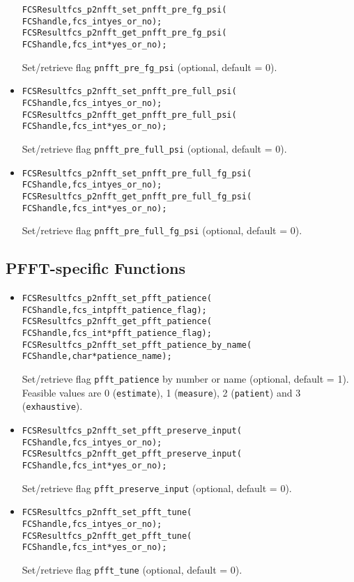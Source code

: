 \begin{itemize}
\begin{alltt}
FCSResult fcs_p2nfft_set_pnfft_pre_fg_psi(
    FCS handle, fcs_int yes_or_no);
FCSResult fcs_p2nfft_get_pnfft_pre_fg_psi(
    FCS handle, fcs_int* yes_or_no);
\end{alltt}
    Set/retrieve flag \verb!pnfft_pre_fg_psi! (optional, default = 0).
  \item
\begin{alltt}
FCSResult fcs_p2nfft_set_pnfft_pre_full_psi(
    FCS handle, fcs_int yes_or_no);
FCSResult fcs_p2nfft_get_pnfft_pre_full_psi(
    FCS handle, fcs_int* yes_or_no);
\end{alltt}
    Set/retrieve flag \verb!pnfft_pre_full_psi! (optional, default = 0).
  \item
\begin{alltt}
FCSResult fcs_p2nfft_set_pnfft_pre_full_fg_psi(
    FCS handle, fcs_int yes_or_no);
FCSResult fcs_p2nfft_get_pnfft_pre_full_fg_psi(
    FCS handle, fcs_int* yes_or_no);
\end{alltt}
    Set/retrieve flag \verb!pnfft_pre_full_fg_psi! (optional, default = 0).
\end{itemize}

\subsection{PFFT-specific Functions}
\begin{itemize}
  \item
\begin{alltt}
FCSResult fcs_p2nfft_set_pfft_patience(
    FCS handle, fcs_int pfft_patience_flag);
FCSResult fcs_p2nfft_get_pfft_patience(
    FCS handle, fcs_int* pfft_patience_flag);
FCSResult fcs_p2nfft_set_pfft_patience_by_name(
    FCS handle, char* patience_name );
\end{alltt}
    Set/retrieve flag \verb!pfft_patience! by number or name (optional, default = 1).
    Feasible values are 0 (\verb!estimate!), 1 (\verb!measure!), 2 (\verb!patient!) and 3 (\verb!exhaustive!).
  \item
\begin{alltt}
FCSResult fcs_p2nfft_set_pfft_preserve_input(
    FCS handle, fcs_int yes_or_no);
FCSResult fcs_p2nfft_get_pfft_preserve_input(
    FCS handle, fcs_int* yes_or_no);
\end{alltt}
    Set/retrieve flag \verb!pfft_preserve_input! (optional, default = 0).
  \item
\begin{alltt}
FCSResult fcs_p2nfft_set_pfft_tune(
    FCS handle, fcs_int yes_or_no);
FCSResult fcs_p2nfft_get_pfft_tune(
    FCS handle, fcs_int* yes_or_no);
\end{alltt}
    Set/retrieve flag \verb!pfft_tune! (optional, default = 0).
\end{itemize}





